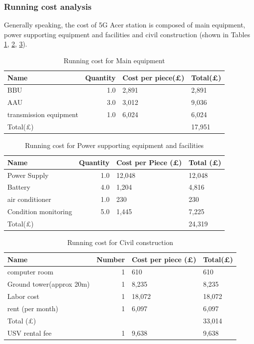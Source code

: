 \documentclass[11pt]{article}
\numberwithin{equation}{section}
\begin{document}
\subsubsection{Running cost analysis}
\label{sec:orge9f8aa9}
Generally speaking, the cost of 5G Acer station is composed of main equipment, power supporting equipment and facilities and civil construction (shown in Tables \ref{MainEquipment}, \ref{PowerSupportingEquipmentAndFacilities}, \ref{CivilConstruction}).

\begin{table}[H]
\caption{\label{MainEquipment}Running cost for Main equipment}
\centering
\begin{tabular}{lrll}
\toprule
Name & Quantity & Cost per piece(\pounds) & Total(\pounds)\\
\midrule
BBU & 1.0 & 2,891 & 2,891\\
AAU & 3.0 & 3,012 & 9,036\\
transmission equipment & 1.0 & 6,024 & 6,024\\
\midrule
Total(\pounds) &  &  & 17,951\\
\bottomrule
\end{tabular}
\end{table}

\begin{table}[H]
\caption{\label{PowerSupportingEquipmentAndFacilities}Running cost for Power supporting equipment and facilities}
\centering
\begin{tabular}{lrll}
\toprule
Name & Quantity & Cost per Piece (\pounds) & Total (\pounds)\\
\midrule
Power Supply & 1.0 & 12,048 & 12,048\\
Battery & 4.0 & 1,204 & 4,816\\
air conditioner & 1.0 & 230 & 230\\
Condition monitoring & 5.0 & 1,445 & 7,225\\
\midrule
Total(\pounds) &  &  & 24,319\\
\bottomrule
\end{tabular}
\end{table}

\begin{table}[H]
\caption{\label{CivilConstruction}Running cost for Civil construction}
\centering
\begin{tabular}{lrll}
\toprule
Name & Number & Cost per piece (\pounds) & Total(\pounds)\\
\midrule
computer room & 1 & 610 & 610\\
Ground tower(approx 20m) & 1 & 8,235 & 8,235\\
Labor cost & 1 & 18,072 & 18,072\\
rent (per month) & 1 & 6,097 & 6,097\\
\midrule
Total (\pounds) &  &  & 33,014\\
\midrule
USV rental fee & 1 & 9,638 & 9,638\\
\bottomrule
\end{tabular}
\end{table}
\end{document}
